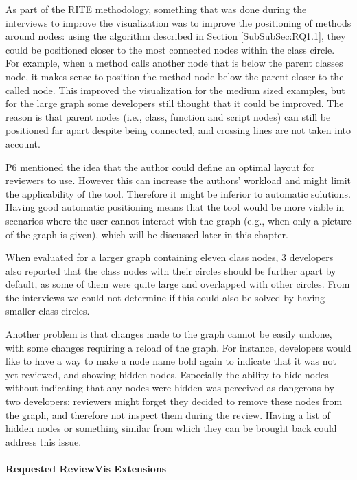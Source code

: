 \documentclass[a4paper,11pt,twoside]{article}
\theoremstyle{definition} %
\begin{document}
As part of the RITE methodology, something that was done during the interviews to improve the visualization was to improve the positioning of methods around nodes: using the algorithm described in Section \ref{SubSubSec:RQ1.1}, they could be positioned closer to the most connected nodes within the class circle. For example, when a method calls another node that is below the parent classes node, it makes sense to position the method node below the parent closer to the called node. This improved the visualization for the medium sized examples, but for the large graph some developers still thought that it could be improved. The reason is that parent nodes (i.e., class, function and script nodes) can still be positioned far apart despite being connected, and crossing lines are not taken into account.

P6 mentioned the idea that the author could define an optimal layout for reviewers to use. However this can increase the authors' workload and might limit the applicability of the tool. Therefore it might be inferior to automatic solutions. Having good automatic positioning means that the tool would be more viable in scenarios where the user cannot interact with the graph (e.g., when only a picture of the graph is given), which will be discussed later in this chapter. 

When evaluated for a larger graph containing eleven class nodes, 3 developers also reported that the class nodes with their circles should be further apart by default, as some of them were quite large and overlapped with other circles. From the interviews we could not determine if this could also be solved by having smaller class circles. 

Another problem is that changes made to the graph cannot be easily undone, with some changes requiring a reload of the graph. For instance, developers would like to have a way to make a node name bold again to indicate that it was not yet reviewed, and showing hidden nodes. Especially the ability to hide nodes without indicating that any nodes were hidden was perceived as dangerous by two developers: reviewers might forget they decided to remove these nodes from the graph, and therefore not inspect them during the review. Having a list of hidden nodes or something similar from which they can be brought back could address this issue.


\paragraph{Requested ReviewVis Extensions} \label{Par:RequestedExtensions}
\end{document}
